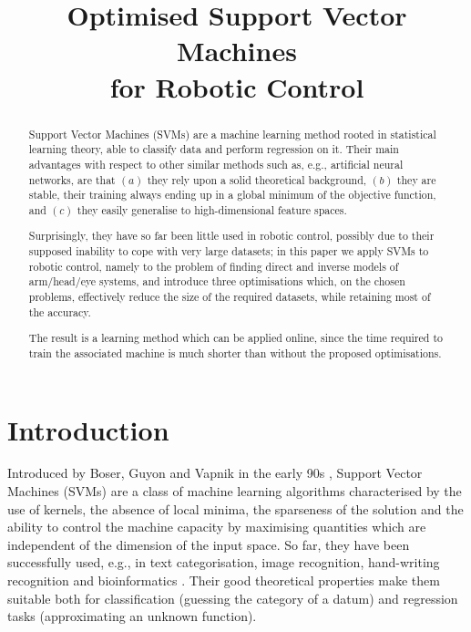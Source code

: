 \documentclass[conference]{IEEEtran}
\begin{document}
\title{Optimised Support Vector Machines\\for Robotic Control}
\author{
}

\maketitle

\pagestyle{empty}
\thispagestyle{empty}

\begin{abstract}

  Support Vector Machines (SVMs) are a machine learning method rooted
  in statistical learning theory, able to classify data and perform
  regression on it. Their main advantages with respect to other
  similar methods such as, e.g., artificial neural networks, are that
  $(a)$ they rely upon a solid theoretical background, $(b)$ they are
  stable, their training always ending up in a global minimum of the
  objective function, and $(c)$ they easily generalise to
  high-dimensional feature spaces.

  Surprisingly, they have so far been little used in robotic control,
  possibly due to their supposed inability to cope with very large
  datasets; in this paper we apply SVMs to robotic control, namely to
  the problem of finding direct and inverse models of arm/head/eye
  systems, and introduce three optimisations which, on the chosen
  problems, effectively reduce the size of the required datasets,
  while retaining most of the accuracy.

  The result is a learning method which can be applied online, since
  the time required to train the associated machine is much shorter
  than without the proposed optimisations.

\end{abstract}

\section{Introduction}

Introduced by Boser, Guyon and Vapnik in the early 90s \cite{BGV92},
Support Vector Machines (SVMs) are a class of machine learning
algorithms characterised by the use of kernels, the absence of local
minima, the sparseness of the solution and the ability to control the
machine capacity by maximising quantities which are independent of the
dimension of the input space. So far, they have been successfully
used, e.g., in text categorisation, image recognition, hand-writing
recognition and bioinformatics \cite{Cristianini00}. Their good
theoretical properties make them suitable both for classification
(guessing the category of a datum) and regression tasks (approximating
an unknown function).
\end{document}

